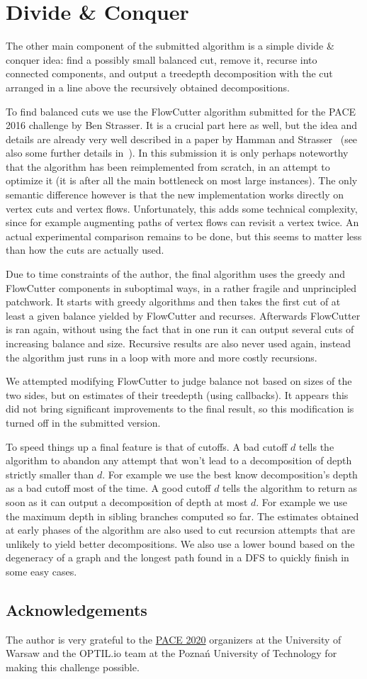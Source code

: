 \documentclass{timgad}
\begin{document}
\section{Divide \& Conquer}
The other main component of the submitted algorithm is a simple divide \& conquer idea: find a possibly small balanced cut, remove it, recurse into connected components, and output a treedepth decomposition with the cut arranged in a line above the recursively obtained decompositions.

To find balanced cuts we use the FlowCutter algorithm submitted for the PACE 2016 challenge by Ben Strasser.
It is a crucial part here as well, but the idea and details are already very well described in a paper by Hamman and Strasser~\cite{HamannS18} (see also some further details in~\cite{Strasser17}).
In this submission it is only perhaps noteworthy that the algorithm has been reimplemented from scratch,
in an attempt to optimize it (it is after all the main bottleneck on most large instances).
The only semantic difference however is that the new implementation works directly on vertex cuts and vertex flows.
Unfortunately, this adds some technical complexity, since for example augmenting paths of vertex flows can revisit a vertex twice.
An actual experimental comparison remains to be done, but this seems to matter less than how the cuts are actually used.

Due to time constraints of the author, the final algorithm uses the greedy and FlowCutter components in suboptimal ways, in a rather fragile and unprincipled patchwork.
It starts with greedy algorithms and then takes the first cut of at least a given balance yielded by FlowCutter and recurses.
Afterwards FlowCutter is ran again, without using the fact that in one run it can output several cuts of increasing balance and size.
Recursive results are also never used again, instead the algorithm just runs in a loop with more and more costly recursions.

We attempted modifying FlowCutter to judge balance not based on sizes of the two sides, but on estimates of their treedepth (using callbacks).
It appears this did not bring significant improvements to the final result, so this modification is turned off in the submitted version.

To speed things up a final feature is that of cutoffs.
A bad cutoff $d$ tells the algorithm to abandon any attempt that won't lead to a decomposition of depth strictly smaller than $d$.
For example we use the best know decomposition's depth as a bad cutoff most of the time.
A good cutoff $d$ tells the algorithm to return as soon as it can output a decomposition of depth at most $d$.
For example we use the maximum depth in sibling branches computed so far.
The estimates obtained at early phases of the algorithm are also used to cut recursion attempts that are unlikely to yield better decompositions.
We also use a lower bound based on the degeneracy of a graph and the longest path found in a DFS to quickly finish in some easy cases.

\subsection*{Acknowledgements}
The author is very grateful to the \href{https://pacechallenge.org/2020}{PACE 2020} organizers at the University of Warsaw and the OPTIL.io team at the Poznań University of Technology for making this challenge possible.

\pagebreak

\printbibliography
\end{document}
